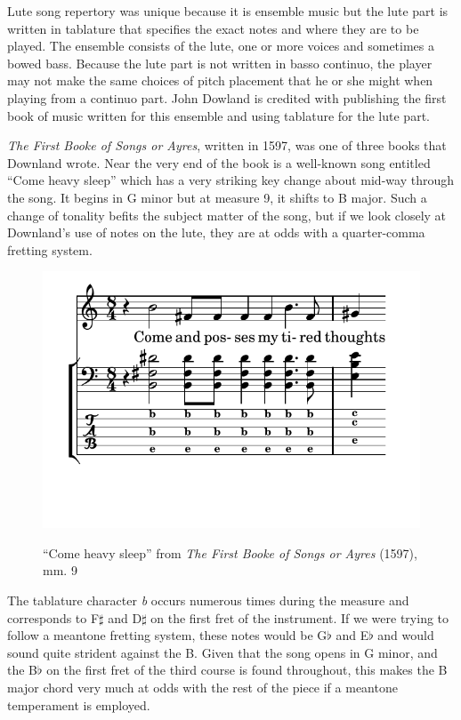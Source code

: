 Lute song repertory was unique because it is ensemble music but the lute part is
written in tablature that specifies the exact notes and where they are to be played.
The ensemble consists of the lute, one or more voices and sometimes a bowed bass.  Because
the lute part is not written in basso continuo, the player may not make the same choices
of pitch placement that he or she might when playing from a continuo part.  John Dowland
is credited with publishing the first book of music written for this ensemble and using
tablature for the lute part.

\textit{The First Booke of Songs or Ayres}, written in 1597, was one of three books that
Downland wrote.  Near the very end of the book is a well-known song entitled ``Come
heavy sleep'' which has a very striking key change about mid-way through the song.
It begins in G minor but at measure 9, it shifts to B major.  Such a change of tonality
befits the subject matter of the song, but if we look closely at Downland's use of
notes on the lute, they are at odds with a quarter-comma fretting system.
\begin{figure}[h]
\centering
\includegraphics{examples/come.pdf}
\label{dowland-come}
\caption{``Come heavy sleep'' from \textit{The First Booke of Songs or Ayres} (1597), mm. 9}
\end{figure}
The tablature character \textit{b} occurs numerous times during the measure and
corresponds to F$\sharp$ and D$\sharp$ on the first fret of the instrument.  If we were
trying to follow a meantone fretting system, these notes would be G$\flat$ and E$\flat$
and would sound quite strident against the B.  Given that the song opens in G minor,
and the B$\flat$ on the first fret of the third course is found throughout, this makes
the B major chord very much at odds with the rest of the piece if a meantone temperament
is employed.

